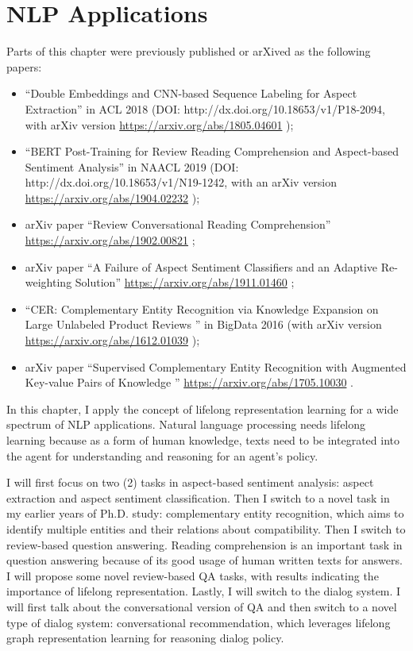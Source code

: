 \chapter{NLP Applications}
\label{chap6:nlp}

Parts of this chapter were previously published or arXived as the following papers:
\begin{itemize}
\item ``Double Embeddings and CNN-based Sequence Labeling for Aspect Extraction'' in ACL 2018 \cite{xu_acl2018} (DOI: http://dx.doi.org/10.18653/v1/P18-2094, with arXiv version \url{https://arxiv.org/abs/1805.04601} \cite{xu2018double});\\
\item ``BERT Post-Training for Review Reading Comprehension and Aspect-based Sentiment Analysis'' in NAACL 2019 \cite{xu2019bert} (DOI: http://dx.doi.org/10.18653/v1/N19-1242, with an arXiv version \url{https://arxiv.org/abs/1904.02232} \cite{xu2019bert_arxiv});\\
\item arXiv paper ``Review Conversational Reading Comprehension'' \url{https://arxiv.org/abs/1902.00821} \cite{xu2019review};\\
\item arXiv paper ``A Failure of Aspect Sentiment Classifiers and an Adaptive Re-weighting Solution'' \url{https://arxiv.org/abs/1911.01460} \cite{xu2019afailure};\\
\item ``CER: Complementary Entity Recognition via Knowledge Expansion on Large Unlabeled Product Reviews
'' in BigData 2016 \cite{xu2016CER} (with arXiv version \url{https://arxiv.org/abs/1612.01039} \cite{xu2016cer_arxiv});\\
\item arXiv paper ``Supervised Complementary Entity Recognition with Augmented Key-value Pairs of Knowledge
'' \url{https://arxiv.org/abs/1705.10030} \cite{xu2017supervised}.
\end{itemize}

In this chapter, I apply the concept of lifelong representation learning for a wide spectrum of NLP applications.
Natural language processing needs lifelong learning because as a form of human knowledge, texts need to be integrated into the agent for understanding and reasoning for an agent's policy.

I will first focus on two (2) tasks in aspect-based sentiment analysis: aspect extraction and aspect sentiment classification.
Then I switch to a novel task in my earlier years of Ph.D. study: complementary entity recognition, which aims to identify multiple entities and their relations about compatibility.
Then I switch to review-based question answering. Reading comprehension is an important task in question answering because of its good usage of human written texts for answers. I will propose some novel review-based QA tasks, with results indicating the importance of lifelong representation.
Lastly, I will switch to the dialog system.
I will first talk about the conversational version of QA and then switch to a novel type of dialog system: conversational recommendation, which leverages lifelong graph representation learning for reasoning dialog policy.

